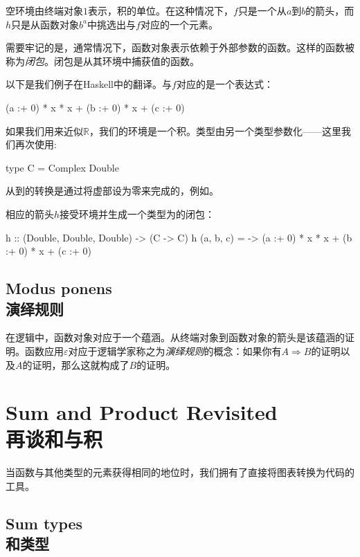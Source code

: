 \documentclass[DaoFP]{subfiles}
\begin{document}
空环境由终端对象$1$表示，积的单位。在这种情况下，$f$只是一个从$a$到$b$的箭头，而$h$只是从函数对象$b^a$中挑选出与$f$对应的一个元素。

需要牢记的是，通常情况下，函数对象表示依赖于外部参数的函数。这样的函数被称为\emph{闭包}。闭包是从其环境中捕获值的函数。

以下是我们例子在Haskell中的翻译。与$f$对应的是一个表达式：
\begin{haskell}
(a :+ 0) * x * x + (b :+ 0) * x + (c :+ 0)
\end{haskell}
如果我们用来近似$\mathbb{R}$，我们的环境是一个积。类型由另一个类型参数化——这里我们再次使用:
\begin{haskell}
type C = Complex Double
\end{haskell}
从到的转换是通过将虚部设为零来完成的，例如。

相应的箭头$h$接受环境并生成一个类型为的闭包：
\begin{haskell}
h :: (Double, Double, Double) -> (C -> C)
h (a, b, c) = \x -> (a :+ 0) * x * x + (b :+ 0) * x + (c :+ 0)
\end{haskell}

\subsection{Modus ponens\\演绎规则}

在逻辑中，函数对象对应于一个蕴涵。从终端对象到函数对象的箭头是该蕴涵的证明。函数应用$\varepsilon$对应于逻辑学家称之为\emph{演绎规则}的概念：如果你有$A \Rightarrow B$的证明以及$A$的证明，那么这就构成了$B$的证明。

\section{Sum and Product Revisited\\再谈和与积}

当函数与其他类型的元素获得相同的地位时，我们拥有了直接将图表转换为代码的工具。

\subsection{Sum types\\和类型}
\end{document}
